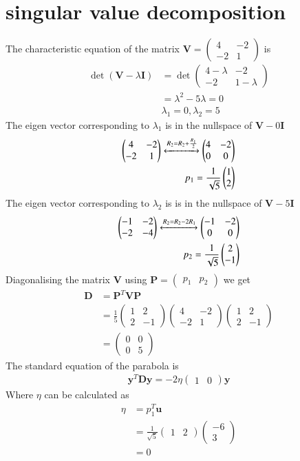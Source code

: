 \documentclass[journal,12pt,twocolumn]{IEEEtran}
\providecommand{\brak}[1]{\ensuremath{\left(#1\right)}}
\newcommand{\myvec}[1]{\ensuremath{\begin{pmatrix}#1\end{pmatrix}}}
\numberwithin{equation}{subsection}
\let\vec\mathbf
\begin{document}
\section{singular value decomposition}
The characteristic equation of the matrix $\vec{V}=\myvec{4&-2\\-2&1}$ is
\begin{align}
    \det \brak{\vec{V}-\lambda\vec{I}}&=\det \myvec{4-\lambda&-2\\-2&1-\lambda}\\
    &=\lambda^2-5\lambda=0\\
    &\lambda_1=0,\lambda_2=5
\end{align}
The eigen vector corresponding to $\lambda_1$ is in the nullspace of $\vec{V}-0\vec{I}$
\begin{align}
    \myvec{4&-2\\-2&1}\xleftrightarrow{R_2=R_2+\frac{R_1}{2}}\myvec{4&-2\\0&0}\\
    p_1=\frac{1}{\sqrt{5}}\myvec{1\\2}
\end{align}
The eigen vector corresponding to $\lambda_2$ is is in the nullspace of $\vec{V}-5\vec{I}$
\begin{align}
    \myvec{-1&-2\\-2&-4}\xleftrightarrow{R_2=R_2-2R_1}\myvec{-1&-2\\0&0}\\
    p_2=\frac{1}{\sqrt{5}}\myvec{2\\-1}
\end{align}
Diagonalising the matrix $\vec{V}$ using $\vec{P}=\myvec{p_1&p_2}$ we get
\begin{align}
    \vec{D}&=\vec{P}^T\vec{V}\vec{P}\\
    &=\frac{1}{5}\myvec{1&2\\2&-1}\myvec{4&-2\\-2&1}\myvec{1&2\\2&-1}\\
    &=\myvec{0&0\\0&5}
\end{align}
The standard equation of the parabola is 
\begin{align}
    \vec{y}^T\vec{D}\vec{y}=-2\eta\myvec{1&0}\vec{y}
\end{align}
Where $\eta$ can be calculated as
\begin{align}
    \eta&=p_1^T\vec{u}\\
    &=\frac{1}{\sqrt{5}}\myvec{1&2}\myvec{-6\\3}\\
    &=0
\end{align}
\end{document}
